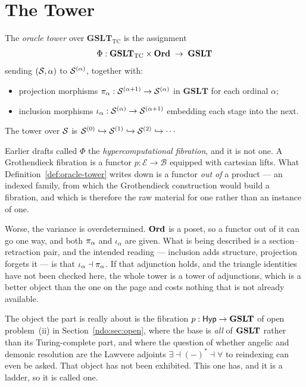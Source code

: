 \section{The Tower}

\begin{definition}
\label{def:oracle-tower}
The \emph{oracle tower} over $\mathbf{GSLT}_{\mathrm{TC}}$ is the
assignment
\[
  \Phi : \mathbf{GSLT}_{\mathrm{TC}} \times \mathbf{Ord} \;\to\; \mathbf{GSLT}
\]
sending $(\mathcal{S}, \alpha)$ to $\mathcal{S}^{(\alpha)}$, together with:
\begin{itemize}[itemsep=2pt]
  \item projection morphisms $\pi_{\alpha} : \mathcal{S}^{(\alpha+1)} \to \mathcal{S}^{(\alpha)}$
        in $\mathbf{GSLT}$ for each ordinal $\alpha$;
  \item inclusion morphisms $\iota_\alpha : \mathcal{S}^{(\alpha)} \to \mathcal{S}^{(\alpha+1)}$
        embedding each stage into the next.
\end{itemize}
The tower over $\mathcal{S}$ is
$\mathcal{S}^{(0)} \hookrightarrow \mathcal{S}^{(1)} \hookrightarrow \mathcal{S}^{(2)}
\hookrightarrow \cdots$
\end{definition}

\begin{remark}
\label{rmk:not-a-fibration}
Earlier drafts called $\Phi$ the \emph{hypercomputational fibration},
and it is not one.
A Grothendieck fibration is a functor $p : \mathcal{E} \to \mathcal{B}$
equipped with cartesian lifts.
What Definition~\ref{def:oracle-tower} writes down is a functor
\emph{out of} a product --- an indexed family, from which the
Grothendieck construction would build a fibration, and which is
therefore the raw material for one rather than an instance of one.

Worse, the variance is overdetermined.
$\mathbf{Ord}$ is a poset, so a functor out of it can go one way, and both
$\pi_{\alpha}$ and $\iota_\alpha$ are given.
What is being described is a section--retraction pair, and the
intended reading --- inclusion adds structure, projection forgets it
--- is that $\iota_\alpha \dashv \pi_{\alpha}$.
If that adjunction holds, and the triangle identities have not been
checked here, the whole tower is a tower of adjunctions, which is a
better object than the one on the page and costs nothing that is not
already available.

The object the part is really about is the fibration
$p : \mathsf{Hyp} \to \mathbf{GSLT}$ of open problem~(ii) in
Section~\ref{ndo:sec:open}, where the base is \emph{all} of
$\mathbf{GSLT}$ rather than its Turing-complete part, and where the
question of whether angelic and demonic resolution are the Lawvere
adjoints $\exists \dashv (-)^{\ast} \dashv \forall$ to reindexing can
even be asked.
That object has not been exhibited.
This one has, and it is a ladder, so it is called one.
\end{remark}

